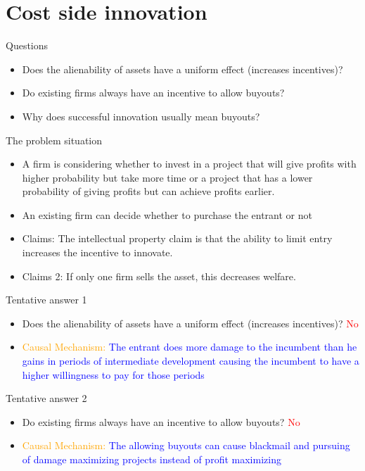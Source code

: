 \documentclass{beamer}
\numberwithin{equation}{section}
\begin{document}
\section{Cost side innovation}
\begin{frame}{Questions}
\begin{itemize}
    \item Does the alienability of assets have a uniform effect (increases incentives)?
    \item Do existing firms always have an incentive to allow buyouts?
    \item Why does successful innovation usually mean buyouts?  
\end{itemize}
\end{frame}
\begin{frame}{The problem situation}
\begin{itemize}
    \item A firm is considering whether to invest in a project that will give profits with higher probability but take more time or a project that has a lower probability of giving profits but can achieve profits earlier. 
    \item An existing firm can decide whether to purchase the entrant or not
    \item Claims: The intellectual property claim is that the ability to limit entry increases the incentive to innovate.    
    \item Claims 2: If only one firm sells the asset, this decreases welfare. 
\end{itemize}
\end{frame}
\begin{frame}{Tentative answer 1}
\begin{itemize}
    \item Does the alienability of assets have a uniform effect (increases incentives)? \textcolor{red}{No}
    \item \textcolor{orange}{Causal Mechanism:} \textcolor{blue}{The entrant does more damage to the incumbent than he gains in periods of intermediate development causing the incumbent to have a higher willingness to pay for those periods}
\end{itemize}
\end{frame}
\begin{frame}{Tentative answer 2}
\begin{itemize}
    \item Do existing firms always have an incentive to allow buyouts? \textcolor{red}{No}
    \item \textcolor{orange}{Causal Mechanism:} \textcolor{blue}{The allowing buyouts can cause blackmail and pursuing of damage maximizing projects instead of profit maximizing}
\end{itemize}
\end{frame}
\end{document}
